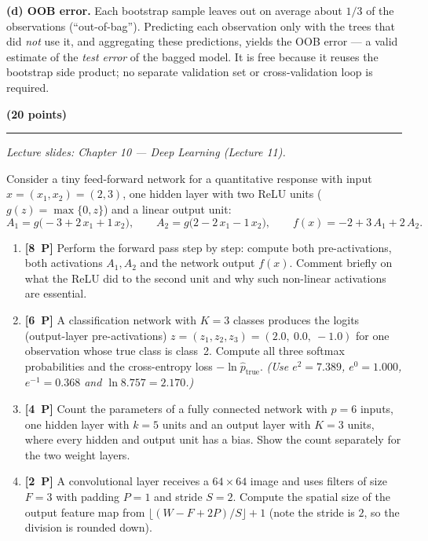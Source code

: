 \documentclass[11pt,a4paper]{article}
\newcommand{\problem}[2]{\par\vspace{7mm}\noindent{\large\textbf{Problem #1}}%
  \hfill{\large\textbf{(#2 points)}}\par\nopagebreak\vspace{0.6mm}%
  \noindent\rule{\textwidth}{0.6pt}\par\nopagebreak\vspace{2.5mm}}
\newcommand{\pp}[1]{\textbf{[#1~P]}\enspace}
\begin{document}
\begin{solutionbox}
\medskip
\textbf{(d) OOB error.}
Each bootstrap sample leaves out on average about $1/3$ of the observations
(``out-of-bag''). Predicting each observation only with the trees that did \emph{not} use it,
and aggregating these predictions, yields the OOB error --- a valid estimate of the
\emph{test error} of the bagged model. It is free because it reuses the bootstrap side
product; no separate validation set or cross-validation loop is required.
\end{solutionbox}
\fi

\problem{5: Neural networks by hand}{20}
{\small\itshape Lecture slides: Chapter 10 --- Deep Learning (Lecture 11).}\par\vspace{1mm}

Consider a tiny feed-forward network for a quantitative response with input
$x=(x_1,x_2)=(2,3)$, one hidden layer with two ReLU units ($g(z)=\max\{0,z\}$) and a linear
output unit:
\[
  A_1=g\bigl(-3+2\,x_1+1\,x_2\bigr),\qquad
  A_2=g\bigl(2-2\,x_1-1\,x_2\bigr),\qquad
  f(x)=-2+3\,A_1+2\,A_2 .
\]

\begin{enumerate}[label=(\alph*),leftmargin=7mm,itemsep=2.5mm]
  \item \pp{8} Perform the forward pass step by step: compute both pre-activations, both
    activations $A_1,A_2$ and the network output $f(x)$. Comment briefly on what the ReLU did
    to the second unit and why such non-linear activations are essential.
  \item \pp{6} A classification network with $K=3$ classes produces the logits (output-layer
    pre-activations) $z=(z_1,z_2,z_3)=(2.0,\ 0.0,\ -1.0)$ for one observation whose true class
    is class~2. Compute all three softmax probabilities and the cross-entropy loss
    $-\ln \hat{p}_{\text{true}}$.
    \emph{(Use $e^{2}=7.389$, $e^{0}=1.000$, $e^{-1}=0.368$ and $\ln 8.757=2.170$.)}
  \item \pp{4} Count the parameters of a fully connected network with $p=6$ inputs, one hidden
    layer with $k=5$ units and an output layer with $K=3$ units, where every hidden and output
    unit has a bias. Show the count separately for the two weight layers.
  \item \pp{2} A convolutional layer receives a $64\times 64$ image and uses filters of size
    $F=3$ with padding $P=1$ and stride $S=2$. Compute the spatial size of the output feature
    map from $\bigl\lfloor(W-F+2P)/S\bigr\rfloor+1$ (note the stride is $2$, so the division is
    rounded down).
\end{enumerate}
\end{document}
